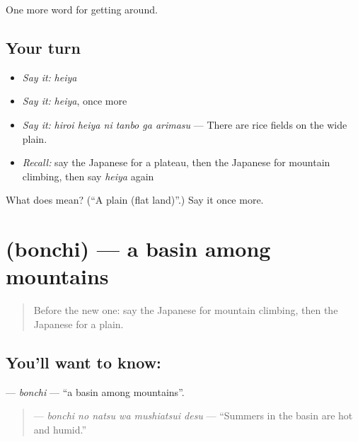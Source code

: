 \begin{grammarlens}[title={What you've built}]
One more word for getting around.
\end{grammarlens}

\subsection*{Your turn}
\begin{itemize}
\raggedright
  \item \emph{Say it:} \emph{heiya}
  \item \emph{Say it:} \emph{heiya}, once more
  \item \emph{Say it:} \emph{hiroi heiya ni tanbo ga arimasu} — There are rice fields on the wide plain.
  \item \emph{Recall:} say the Japanese for a plateau, then the Japanese for mountain climbing, then say \emph{heiya} again
\end{itemize}

\begin{tcolorbox}[breakable,colback=teal!4,colframe=teal!35!black,title={Before you move on}]
What does  mean? (\textquotedblleft{}A plain (flat land)\textquotedblright{}.) Say it once more.
\end{tcolorbox}
\section[\texorpdfstring{\ja{ぼんち} (bonchi)}{ぼんち (bonchi)}]{ (bonchi) — a basin among mountains}

\label{lesson:JA-C413-bonchi}



\begin{quote}
Before the new one: say the Japanese for mountain climbing, then the Japanese for a plain.
\end{quote}

\subsection*{You'll want to know: }
\textbf{} — \emph{bonchi} — \textquotedblleft{}a basin among mountains\textquotedblright{}.

\begin{quote}
\textbf{  } — \emph{bonchi no natsu wa mushiatsui desu} — \textquotedblleft{}Summers in the basin are hot and humid.\textquotedblright{}
\end{quote}

